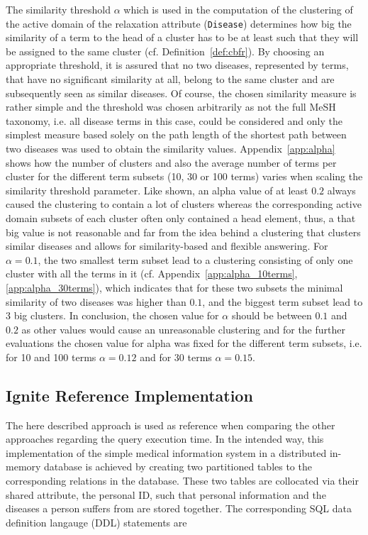 The similarity threshold $\alpha$ which is used in the computation of the clustering of the active domain of the relaxation attribute (\verb!Disease!) 
determines how big the similarity of a term to the head of a cluster has to be at least such that they will be assigned to the same cluster 
(cf. Definition~\ref{def:cbfr}). By choosing an appropriate threshold, it is assured that no two diseases, represented by terms, that have no significant
similarity at all, belong to the same cluster and are subsequently seen as similar diseases. Of course, the chosen similarity measure is rather simple and the
threshold was chosen arbitrarily as not the full MeSH taxonomy, i.e. all disease terms in this case, could be considered and only the simplest measure based 
solely on the path length of the shortest path between two diseases was used to obtain the similarity values. Appendix~\ref{app:alpha} shows how the number of 
clusters and also the average number of terms per cluster for the different term subsets (10, 30 or 100 terms) varies when scaling the similarity threshold
parameter. Like shown, an alpha value of at least $0.2$ always caused the clustering to contain a lot of clusters whereas the corresponding active domain 
subsets of each cluster often only contained a head element, thus, a that big value is not reasonable and far from the idea behind a clustering that clusters
similar diseases and allows for similarity-based and flexible answering. For $\alpha=0.1$, the two smallest term subset lead to a clustering consisting of only
one cluster with all the terms in it (cf. Appendix~\ref{app:alpha_10terms}, \ref{app:alpha_30terms}), which indicates that for these two subsets the minimal
similarity of two diseases was higher than $0.1$, and the biggest term subset lead to 3 big clusters. In conclusion, the chosen value for $\alpha$ should be
between $0.1$ and $0.2$ as other values would cause an unreasonable clustering and for the further evaluations the chosen value for alpha was fixed for the
different term subsets, i.e. for 10 and 100 terms $\alpha=0.12$ and for 30 terms $\alpha=0.15$.


\subsection{Ignite Reference Implementation}
\label{sec:impl_refimpl}
The here described approach is used as reference when comparing the other approaches regarding the query execution time. In the intended way, this
implementation of the simple medical information system in a distributed in-memory  database is achieved by creating two partitioned tables
to the corresponding relations in the database. These two tables are collocated via their shared attribute, the personal ID, such that personal information and
the diseases a person suffers from are stored together. The corresponding SQL data definition langauge (DDL) statements are

